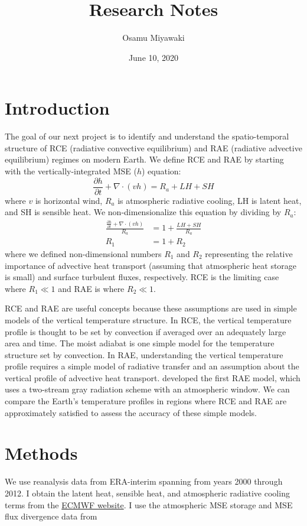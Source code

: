 \documentclass[11pt]{article}
\author{Osamu Miyawaki}
\date{June 10, 2020}
\title{Research Notes}
\begin{document}
\maketitle

\section{Introduction}
\label{sec:org87a156c}
The goal of our next project is to identify and understand the spatio-temporal structure of RCE (radiative convective equilibrium) and RAE (radiative advective equilibrium) regimes on modern Earth. We define RCE and RAE by starting with the vertically-integrated MSE (\(h\)) equation:
\begin{equation}
\frac{\partial h}{\partial t} + \nabla\cdot(vh) = R_a + LH + SH
\end{equation}
where \(v\) is horizontal wind, \(R_a\) is atmospheric radiative cooling, LH is latent heat, and SH is sensible heat. We non-dimensionalize this equation by dividing by \(R_a\):
\begin{align}
\frac{\frac{\partial h}{\partial t} + \nabla\cdot(vh)}{R_a} &= 1 + \frac{LH + SH}{R_a} \\
R_1 &= 1 + R_2
\end{align}
where we defined non-dimensional numbers \(R_1\) and \(R_2\) representing the relative importance of advective heat transport (assuming that atmospheric heat storage is small) and surface turbulent fluxes, respectively. RCE is the limiting case where \(R_1 \ll 1\) and RAE is where \(R_2 \ll 1\).

RCE and RAE are useful concepts because these assumptions are used in simple models of the vertical temperature structure. In RCE, the vertical temperature profile is thought to be set by convection if averaged over an adequately large area and time. The moist adiabat is one simple model for the temperature structure set by convection. In RAE, understanding the vertical temperature profile requires a simple model of radiative transfer and an assumption about the vertical profile of advective heat transport. \cite{cronin_analytic_2016} developed the first RAE model, which uses a two-stream gray radiation scheme with an atmospheric window. We can compare the Earth's temperature profiles in regions where RCE and RAE are approximately satisfied to assess the accuracy of these simple models.

\section{Methods}
\label{sec:org0977f9f}
We use reanalysis data from ERA-interim spanning from years 2000 through 2012. I obtain the latent heat, sensible heat, and atmospheric radiative cooling terms from the \href{https://apps.ecmwf.int/datasets/data/interim-mdfa/levtype=sfc/}{ECMWF website}. I use the atmospheric MSE storage and MSE flux divergence data from \cite{donohoe_seasonal_2013}
\end{document}
